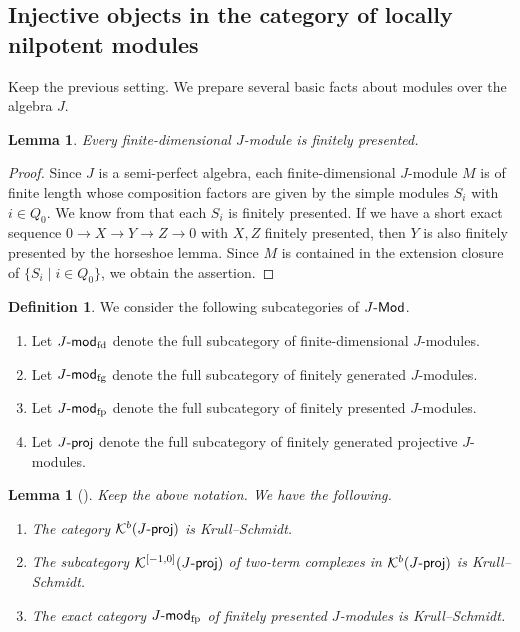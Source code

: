 \documentclass[12pt]{amsart}
\newtheorem{lemma}[theorem]{Lemma}
\theoremstyle{definition}
\newtheorem{definition}[theorem]{Definition}
\theoremstyle{remark}
\numberwithin{equation}{section}
\newcommand{\projc}{\mathchar`-\mathsf{proj}}
\newcommand{\cK}{\mathcal{K}}
\newcommand{\modfp}{\mathchar`-\mathsf{mod}_{\mathrm{fp}}}
\newcommand{\modfg}{\mathchar`-\mathsf{mod}_{\mathrm{fg}}}
\newcommand{\Mod}{\mathchar`-\mathsf{Mod}}
\newcommand{\modfd}{\mathchar`-\mathsf{mod}_{\mathrm{fd}}}
\begin{document}
\subsection{Injective objects in the category of locally nilpotent modules}\label{subsecA:inj}
Keep the previous setting. We prepare several basic facts about modules over the algebra $J$.




\begin{lemma}\label{lem:fd_fp}
    Every finite-dimensional $J$-module is finitely presented.
\end{lemma}
\begin{proof}
    Since $J$ is a semi-perfect algebra, each finite-dimensional $J$-module $M$ is of finite length whose composition factors are given by the simple modules $S_i$ with
 $i\in Q_0$. We know from \cite[Proposition~3.3]{BIRSm11} that each $S_i$ is finitely presented. If we have a short exact sequence
    $0\to X\to Y\to Z \to 0$ with $X, Z$ finitely presented, then $Y$ is also finitely presented by the horseshoe lemma. Since $M$ is contained in the extension closure of $\{S_i\mid i\in Q_0\}$, we obtain the assertion.
\end{proof}
\begin{definition}
    We consider the following subcategories of $J\Mod$.
    \begin{enumerate}
    \item[(i)]  Let $J\modfd$ denote the full subcategory of finite-dimensional $J$-modules.
    \item [(ii)]  Let $J\modfg$ denote the full subcategory of finitely generated $J$-modules.
        \item[(iii)] Let $J\modfp$ denote the full subcategory of finitely presented $J$-modules.
        \item[(iv)] Let $J\projc$ denote the full subcategory of finitely generated projective $J$-modules.
    \end{enumerate}
\end{definition}
\begin{lemma}[{\cite{KM22,Keller-Yang_2011}}] \label{lem:A-Krull-Sch}
    Keep the above notation. We have the following.
    \begin{enumerate}
        \item[(i)] The category $\cK^b(J\projc)$ is Krull--Schmidt.
        \item[(ii)] The subcategory $\cK^{[-1, 0]}(J\projc)$ of two-term complexes in  $\cK^b(J\projc)$ is Krull--Schmidt.
        \item[(iii)] The exact category $J\modfp$ of finitely presented $J$-modules is Krull--Schmidt.
    \end{enumerate}
\end{lemma}
\end{document}
